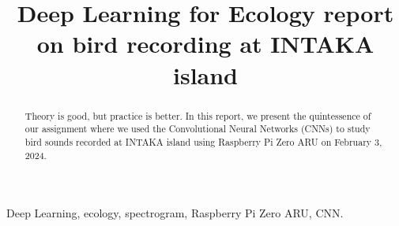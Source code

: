 \documentclass[conference]{IEEEtran}
\begin{document}
	
	\title{Deep Learning for Ecology report on bird recording at INTAKA island}
	
	\author{
		}
		\maketitle
	
\begin{abstract}
Theory is good, but practice is better. In this report, we present the quintessence of our assignment where we used the Convolutional Neural Networks (CNNs) to study bird sounds recorded at INTAKA island using  Raspberry Pi Zero ARU on February 3, 2024.		
\end{abstract}
	
	\begin{IEEEkeywords}
	Deep Learning, ecology, spectrogram, Raspberry Pi Zero 
	ARU, CNN.
	\end{IEEEkeywords}
\end{document}
